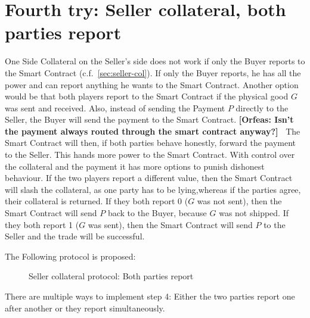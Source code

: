 \documentclass{cacthesis}
\newcommand{\authnote}[3]{{ \footnotesize \textbf{#1[#2: #3]~}}}
\newcommand{\orfnote}[1]{\authnote{\color{blue}}{Orfeas}{#1}}
\begin{document}
\section{Fourth try: Seller collateral, both parties report}
One Side Collateral on the Seller's side does not work if only the Buyer reports
to the Smart Contract (c.f.~\ref{sec:seller-col}). If only the Buyer reports, he has all the power and can report anything he wants to the Smart Contract.
Another option would be that both players report to the Smart Contract if the physical good $G$ was sent and received.
Also, instead of sending the Payment $P$ directly to the Seller, the Buyer will
send the payment to the Smart Contract. \orfnote{Isn't the payment always routed
through the smart contract anyway?} The Smart Contract will then, if both parties behave honestly, forward the payment to the Seller. This hands more power to the Smart Contract. With control over the collateral and the payment it has more options to punish dishonest behaviour. 
If the two players report a different value, then the Smart Contract will slash
the collateral, as one party has to be lying,whereas if the parties
agree, their collateral is returned. If they both report 0 ($G$ was not sent),
then the Smart Contract will send $P$ back to the Buyer, because $G$ was not
shipped. If they both report 1 ($G$ was sent), then the Smart Contract will send
$P$ to the Seller and the trade will be successful.\newline

The Following protocol is proposed:
\begin{figure}[htb!]
    \centering
    \caption{Seller collateral protocol: Both parties report}
    \label{pro:seller-col-both-report}
\end{figure}

There are multiple ways to implement step 4: Either the two parties report one after another or they report simultaneously.
\end{document}
